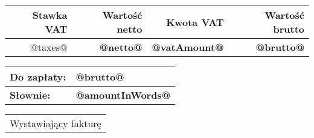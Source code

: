 \documentclass[a4paper,12pt,oneside]{mwart}
\makeatletter
\newcommand{\issuer}{@issuer@}
\newcommand{\netto}{@netto@}
\newcommand{\taxes}{@taxes@}
\newcommand{\vatAmount}{@vatAmount@}
\newcommand{\brutto}{@brutto@}
\newcommand{\amountInWords}{@amountInWords@}
\newcommand{\sig}{\@signature@{\Large{\color{Blue!60!black}{\issuer}}}}
\makeatother
\begin{document}
\begin{footnotesize}
	\bigskip
	\begin{flushright}
		\def\arraystretch{1.2}
		\begin{tabular}{| r | r | r | r |}
			\hline
				\textbf{Stawka VAT}&\textbf{Wartość netto}&\textbf{Kwota VAT}&\textbf{Wartość brutto} \\
			\hline
				\taxes
			\hline
				\multicolumn{1}{|c|}{\textbf{Razem}}&\textbf{\netto}&\textbf{\vatAmount}&\textbf{\brutto} \\
			\hline
		\end{tabular}
	\end{flushright}
\end{footnotesize}

\bigskip
\begin{flushleft}
	\begin{small}
		\begin{tabular}{ l l }
			\textbf{Do zapłaty:}&\textbf{\brutto} \\
		\hline
			\textbf{Słownie:}&\textbf{\amountInWords}
		\end{tabular}
	\end{small}
\end{flushleft}

\bigskip
\begin{tabular}{ c }
\sig \\
\hline
Wystawiający fakturę
\end{tabular}
\end{document}
